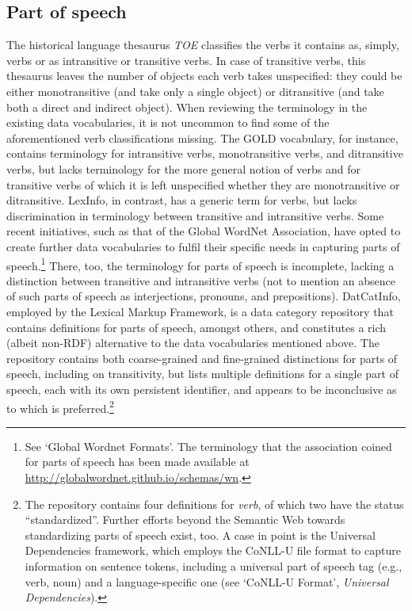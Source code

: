 \subsection{Part of speech}
\label{sect:Stolk_thes-digital-form:semweb-pos}
The historical language thesaurus \textit{TOE} classifies the verbs it contains as, simply, verbs or as intransitive or transitive verbs. In case of transitive verbs, this thesaurus leaves the number of objects each verb takes unspecified: they could be either monotransitive (and take only a single object) or ditransitive (and take both a direct and indirect object). When reviewing the terminology in the existing data vocabularies, it is not uncommon to find some of the aforementioned verb classifications missing. The GOLD vocabulary, for instance, contains terminology for intransitive verbs, monotransitive verbs, and ditransitive verbs, but lacks terminology for the more general notion of verbs and for transitive verbs of which it is left unspecified whether they are monotransitive or ditransitive. %
LexInfo, in contrast, has a generic term for verbs, but lacks discrimination in terminology between transitive and intransitive verbs. 
Some recent initiatives, such as that of the Global WordNet Association, have opted to create further data vocabularies to fulfil their specific needs in capturing parts of speech.\footnote{See `Global Wordnet Formats'. The terminology that the association coined for parts of speech has been made available at \url{http://globalwordnet.github.io/schemas/wn}.} There, too, the terminology for parts of speech is incomplete, lacking a distinction between transitive and intransitive verbs (not to mention an absence of such parts of speech as interjections, pronouns, and prepositions). 
DatCatInfo, employed by the Lexical Markup Framework, is a data category repository that contains definitions for parts of speech, amongst others, and constitutes a rich (albeit non-RDF) alternative to the data vocabularies mentioned above. The repository contains both coarse-grained and fine-grained distinctions for parts of speech, including on transitivity, but lists multiple definitions for a single part of speech, each with its own persistent identifier, and appears to be inconclusive as to which is preferred.\footnote{The repository contains four definitions for \textit{verb}, of which two have the status ``standardized''. %
Further efforts beyond the Semantic Web towards standardizing parts of speech exist, too. A case in point is the Universal Dependencies framework, which employs the CoNLL-U file format to capture information on sentence tokens, including a universal part of speech tag (e.g., verb, noun) and a language-specific one (see `CoNLL-U Format', \textit{Universal Dependencies}).} 

